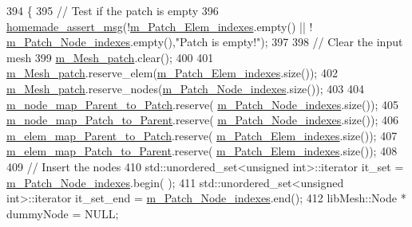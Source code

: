 \begin{DoxyCode}
394 \{
395     \textcolor{comment}{// Test if the patch is empty}
396     \hyperlink{common__header_8h_a593ccc80b790b2268653fcf6597bf451}{homemade\_assert\_msg}(!\hyperlink{classcarl_1_1_patch__construction_af7db498027d46bff8464757e824404fb}{m\_Patch\_Elem\_indexes}.empty() || !
      \hyperlink{classcarl_1_1_patch__construction_a85fb959e6f57d935a8d6fe0d4f0f7f46}{m\_Patch\_Node\_indexes}.empty(),\textcolor{stringliteral}{"Patch is empty!"});
397 
398     \textcolor{comment}{// Clear the input mesh}
399     \hyperlink{classcarl_1_1_patch__construction_a4dfae5a2c4a983ac31dacec1cdb29d11}{m\_Mesh\_patch}.clear();
400 
401     \hyperlink{classcarl_1_1_patch__construction_a4dfae5a2c4a983ac31dacec1cdb29d11}{m\_Mesh\_patch}.reserve\_elem(\hyperlink{classcarl_1_1_patch__construction_af7db498027d46bff8464757e824404fb}{m\_Patch\_Elem\_indexes}.size());
402     \hyperlink{classcarl_1_1_patch__construction_a4dfae5a2c4a983ac31dacec1cdb29d11}{m\_Mesh\_patch}.reserve\_nodes(\hyperlink{classcarl_1_1_patch__construction_a85fb959e6f57d935a8d6fe0d4f0f7f46}{m\_Patch\_Node\_indexes}.size());
403 
404     \hyperlink{classcarl_1_1_patch__construction_aace17a766982c2c00b603561f3df9814}{m\_node\_map\_Parent\_to\_Patch}.reserve(
      \hyperlink{classcarl_1_1_patch__construction_a85fb959e6f57d935a8d6fe0d4f0f7f46}{m\_Patch\_Node\_indexes}.size());
405     \hyperlink{classcarl_1_1_patch__construction_a8a53700b4debd54f12cd42d62f991e5a}{m\_node\_map\_Patch\_to\_Parent}.reserve(
      \hyperlink{classcarl_1_1_patch__construction_a85fb959e6f57d935a8d6fe0d4f0f7f46}{m\_Patch\_Node\_indexes}.size());
406     \hyperlink{classcarl_1_1_patch__construction_a2552a3745b426adbd06864ade93b9973}{m\_elem\_map\_Parent\_to\_Patch}.reserve(
      \hyperlink{classcarl_1_1_patch__construction_af7db498027d46bff8464757e824404fb}{m\_Patch\_Elem\_indexes}.size());
407     \hyperlink{classcarl_1_1_patch__construction_a801e75fa9573645a57d24b996611fe4d}{m\_elem\_map\_Patch\_to\_Parent}.reserve(
      \hyperlink{classcarl_1_1_patch__construction_af7db498027d46bff8464757e824404fb}{m\_Patch\_Elem\_indexes}.size());
408 
409     \textcolor{comment}{// Insert the nodes}
410     std::unordered\_set<unsigned int>::iterator it\_set     = \hyperlink{classcarl_1_1_patch__construction_a85fb959e6f57d935a8d6fe0d4f0f7f46}{m\_Patch\_Node\_indexes}.begin(
      );
411     std::unordered\_set<unsigned int>::iterator it\_set\_end = \hyperlink{classcarl_1_1_patch__construction_a85fb959e6f57d935a8d6fe0d4f0f7f46}{m\_Patch\_Node\_indexes}.end();
412     libMesh::Node * dummyNode = NULL;

\end{DoxyCode}
